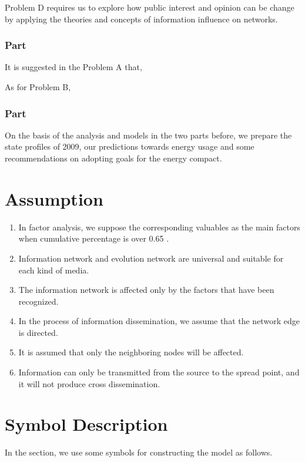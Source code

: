 \documentclass[a4paper,11pt]{article}
\begin{document}
\par Problem D requires us to explore how public interest and opinion can be change by applying the theories and concepts of information influence on networks. 

\subsubsection{Part \uppercase\expandafter{}}
\par It is suggested in the Problem A that,

\par As for Problem B, 

\subsubsection{Part \uppercase\expandafter{}}
\par On the basis of the analysis and models in the two parts before, we prepare the state profiles of 2009, our predictions towards energy usage and some recommendations on adopting goals for the energy compact.


\section{Assumption}
\begin{enumerate}%
\renewcommand{\labelenumi}{(\theenumi)}
    \item In factor analysis, we suppose the corresponding valuables as the main factors when cumulative percentage is over 0.65 .
    \item Information network and evolution network are universal and suitable for each kind of media.
    \item The information network is affected  only by the factors that have been recognized.
    \item In the process of information dissemination, we assume that the network edge is directed.
    \item It is assumed that only the neighboring nodes will be affected.
    \item Information can only be transmitted from the source to the spread point, and it will not produce cross dissemination.
\end{enumerate}



\section{Symbol Description}
In the section, we use some symbols for constructing the model as follows.
\end{document}
